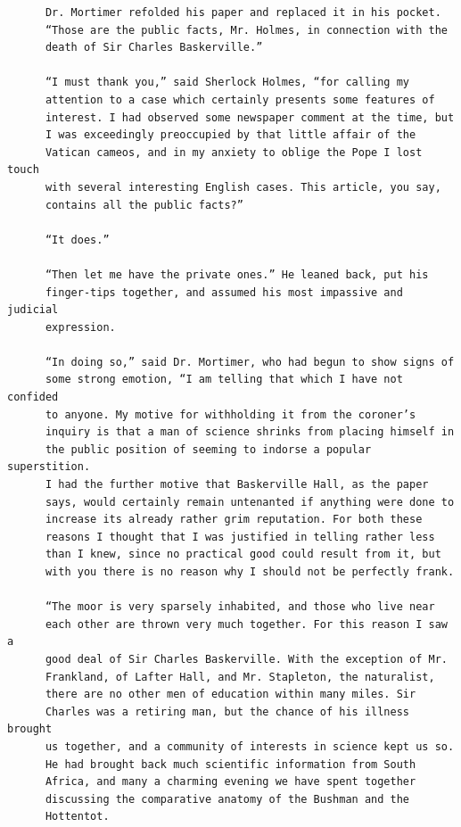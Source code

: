 \documentclass{article}
\begin{document}
\begin{verbatim}
      Dr. Mortimer refolded his paper and replaced it in his pocket.
      “Those are the public facts, Mr. Holmes, in connection with the
      death of Sir Charles Baskerville.”

      “I must thank you,” said Sherlock Holmes, “for calling my
      attention to a case which certainly presents some features of
      interest. I had observed some newspaper comment at the time, but
      I was exceedingly preoccupied by that little affair of the
      Vatican cameos, and in my anxiety to oblige the Pope I lost touch
      with several interesting English cases. This article, you say,
      contains all the public facts?”

      “It does.”

      “Then let me have the private ones.” He leaned back, put his
      finger-tips together, and assumed his most impassive and judicial
      expression.

      “In doing so,” said Dr. Mortimer, who had begun to show signs of
      some strong emotion, “I am telling that which I have not confided
      to anyone. My motive for withholding it from the coroner’s
      inquiry is that a man of science shrinks from placing himself in
      the public position of seeming to indorse a popular superstition.
      I had the further motive that Baskerville Hall, as the paper
      says, would certainly remain untenanted if anything were done to
      increase its already rather grim reputation. For both these
      reasons I thought that I was justified in telling rather less
      than I knew, since no practical good could result from it, but
      with you there is no reason why I should not be perfectly frank.

      “The moor is very sparsely inhabited, and those who live near
      each other are thrown very much together. For this reason I saw a
      good deal of Sir Charles Baskerville. With the exception of Mr.
      Frankland, of Lafter Hall, and Mr. Stapleton, the naturalist,
      there are no other men of education within many miles. Sir
      Charles was a retiring man, but the chance of his illness brought
      us together, and a community of interests in science kept us so.
      He had brought back much scientific information from South
      Africa, and many a charming evening we have spent together
      discussing the comparative anatomy of the Bushman and the
      Hottentot.


\end{verbatim}
\end{document}
